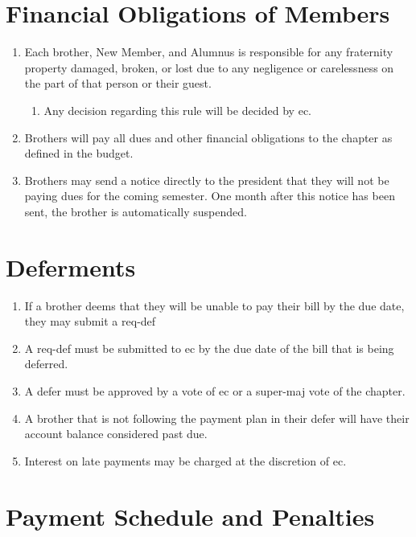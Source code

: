\section{Financial Obligations of Members}
\label{fin-obligations}

	\begin{enumerate}
		\item Each brother, New Member, and Alumnus is responsible for any fraternity property damaged, broken, or lost due to any negligence or carelessness on the part of that person or their guest.
		\begin{enumerate}
			\item Any decision regarding this rule will be decided by \gls{ec}.
		\end{enumerate}

		\item Brothers will pay all dues and other financial obligations to the chapter as defined in the budget.

		\item Brothers may send a notice directly to the president that they will not be paying dues for the coming semester. One month after this notice has been sent, the brother is automatically suspended.

	\end{enumerate}

\section{Deferments}
\label{req-def}
	\begin{enumerate}
		\item If a brother deems that they will be unable to pay their bill by the due date, they may submit a \gls{req-def}
		\item A \gls{req-def} must be submitted to \gls{ec} by the due date of the bill that is being deferred.
		\item A \gls{defer} must be approved by a vote of \gls{ec} or a \gls{super-maj} vote of the chapter.
		\item A brother that is not following the payment plan in their \gls{defer} will have their account balance considered past due.
		\item Interest on late payments may be charged at the discretion of \gls{ec}.
	\end{enumerate}

\section{Payment Schedule and Penalties}

